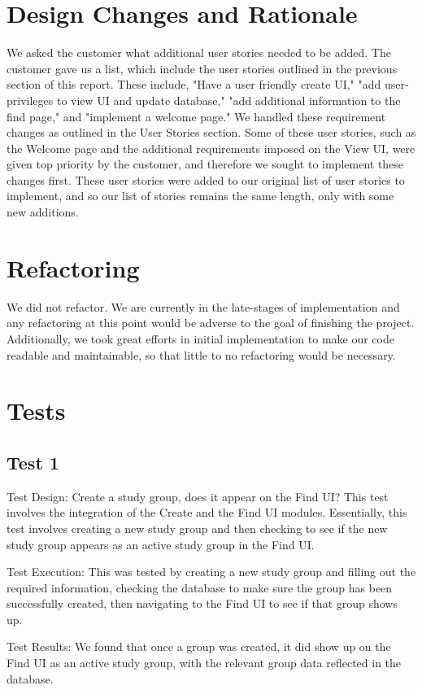 \documentclass[12pt,letterpaper]{article}
\begin{document}
\section{Design Changes and Rationale}
We asked the customer what additional user stories needed to be added. The customer gave us a list, which include the user stories outlined in the previous section of this report. These include, "Have a user friendly create UI," "add user-privileges to view UI and update database," "add additional information to the find page," and "implement a welcome page." We handled these requirement changes as outlined in the User Stories section. Some of these user stories, such as the Welcome page and the additional requirements imposed on the View UI, were given top priority by the customer, and therefore we sought to implement these changes first. These user stories were added to our original list of user stories to implement, and so our list of stories remains the same length, only with some new additions. 

\section{Refactoring}
We did not refactor. We are currently in the late-stages of implementation and any refactoring at this point would be adverse to the goal of finishing the project. Additionally, we took great efforts in initial implementation to make our code readable and maintainable, so that little to no refactoring would be necessary. 

\clearpage
\section{Tests}
\subsection{Test 1}
Test Design: Create a study group, does it appear on the Find UI? This test involves the integration of the Create and the Find UI modules. Essentially, this test involves creating a new study group and then checking to see if the new study group appears as an active study group in the Find UI.

Test Execution: This was tested by creating a new study group and filling out the required information, checking the database to make sure the group has been successfully created, then navigating to the Find UI to see if that group shows up. 

Test Results: We found that once a group was created, it did show up on the Find UI as an active study group, with the relevant group data reflected in the database.
\end{document}
